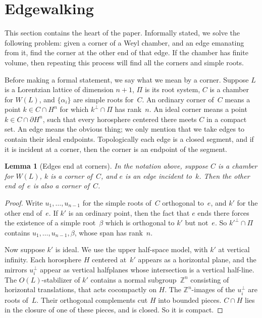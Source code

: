 \documentclass[12pt]{amsart}
\def\Z{\mathbb{Z}}
\numberwithin{theorem}{section}
\numberwithin{equation}{section}
\numberwithin{figure}{section}
\newtheorem{lemma}[theorem]{Lemma}
\theoremstyle{remark}
\begin{document}
\section{Edgewalking}
\label{SecEdgewalking}

\noindent
This section contains the heart of the paper.  
Informally stated, we solve the following problem: given a corner of
a Weyl chamber, and an edge emanating from it, find the corner at the
other end of that edge.  If the chamber has finite volume, then repeating
this process will find all the corners and simple roots.  

Before making a formal statement, we say what we mean by a corner.
Suppose $L$ is
a Lorentzian lattice of dimension $n+1$, $\Pi$ is its root
system, $C$ is a chamber for $W(L)$,
and  $\{\alpha_i\}$ are simple roots for~$C$.
An ordinary corner of~$C$ means a point $k\in C\cap H^n$ for
which $k^\perp\cap\Pi$ has rank~$n$.  An ideal corner means
a point $k\in C\cap\partial H^n$, such that every
horosphere centered there meets $C$ in a compact set.  An edge
means the obvious thing; we only mention that we take edges
to contain their ideal endpoints.  Topologically each edge is
a closed segment, and if it is incident at a corner, then the
corner is an endpoint of the segment.

\begin{lemma}[Edges end at corners]
    \label{LemEndsOfEdges}
    In the notation above, suppose $C$ is a chamber for $W(L)$,
    $k$ is a corner of~$C$, and $e$ is an edge incident to~$k$.
    Then the other end of~$e$ is also a corner of~$C$.
\end{lemma}

\begin{proof}
    Write $u_1,\dots,u_{n-1}$ for
    the simple roots of~$C$ orthogonal to~$e$, and
    $k'$ for the other end of~$e$.  If $k'$ is an ordinary point, then
    the fact that $e$ ends there forces the existence of a
    simple root~$\beta$ which is orthogonal to $k'$ but not~$e$.
    So $k'^\perp\cap\Pi$ contains $u_1,\dots,u_{n-1},\beta$, whose
    span has rank~$n$.

    Now suppose $k'$ is ideal.  
   We use the upper half-space model, with $k'$ at vertical
    infinity.  Each horosphere $H$ 
    centered at~$k'$ appears as a horizontal plane, and the 
    mirrors $u_i^\perp$ appear as vertical halfplanes whose
    intersection is a vertical half-line.
    The $O(L)$-stabilizer of $k'$ contains a normal subgroup~$\Z^n$
    consisting of horizontal translations, 
    that acts cocompactly on $H$.   The $\Z^n$-images of the $u_i^\perp$
    are roots of~$L$.  Their orthogonal complements cut $H$ into bounded
    pieces.  $C\cap H$ lies in the closure of one of  these pieces, 
    and is closed.  So it is  compact.
\end{proof}
\end{document}
